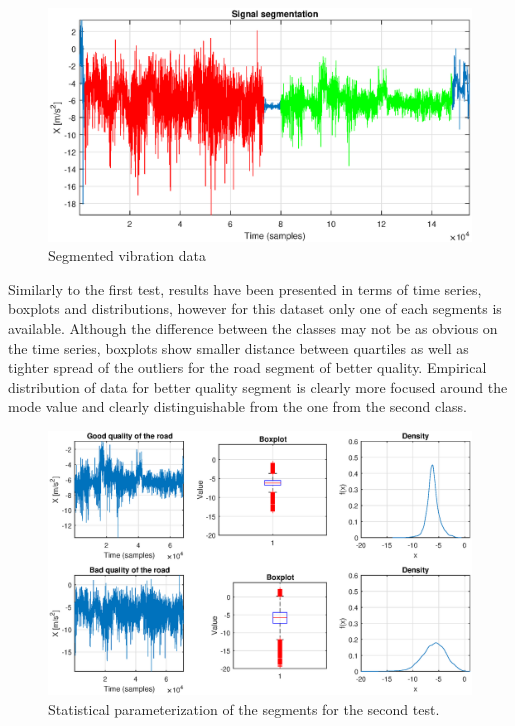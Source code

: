\documentclass[10pt]{article}
\begin{document}
\begin{figure}[ht!]
\centering
\includegraphics[width=\textwidth]{wykresy/Seg2.eps}
\caption{Segmented vibration data}
\label{fig:seg2}
\end{figure}

Similarly to the first test, results have been presented in terms of time series, boxplots and distributions, however for this dataset only one of each segments is available. Although the difference between the classes may not be as obvious on the time series, boxplots show smaller distance between quartiles as well as tighter spread of the outliers for the road segment of better quality. Empirical distribution of data for better quality segment is clearly more focused around the mode value and clearly distinguishable from the one from the second class. 

\begin{figure}[ht!]
\centering
\includegraphics[width=\textwidth]{wykresy/stat2.eps}
\caption{Statistical parameterization of the segments for the second test.}
\label{fig:stat2}
\end{figure}
\end{document}
